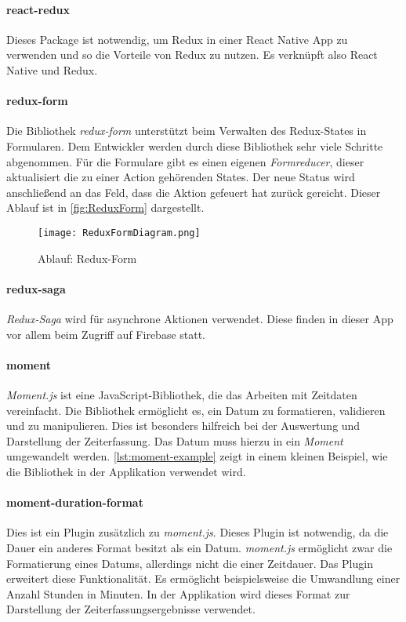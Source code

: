 \paragraph{react-redux}
Dieses Package ist notwendig, um Redux in einer React Native App zu verwenden und so die Vorteile von
Redux zu nutzen. Es verknüpft also React Native und Redux.
\cite{ReactRedux:online}

\paragraph{redux-form}
Die Bibliothek \textit{redux-form} unterstützt beim Verwalten des Redux-States in Formularen.
Dem Entwickler werden durch diese Bibliothek sehr viele Schritte abgenommen. Für die Formulare
gibt es einen eigenen \textit{Formreducer}, dieser aktualisiert die zu einer Action gehörenden States.
Der neue Status wird anschließend an das Feld, dass die Aktion gefeuert hat zurück gereicht. Dieser
Ablauf ist in \autoref{fig:ReduxForm} dargestellt. \cite{ReduxForm:online}

\begin{figure}[h]
    \centering
    \texttt{[image: ReduxFormDiagram.png]}
    \caption{Ablauf: Redux-Form}
    \label{fig:ReduxForm}
\end{figure}

\paragraph{redux-saga}
\textit{Redux-Saga} wird für asynchrone Aktionen verwendet. Diese finden in dieser
App vor allem beim Zugriff auf Firebase statt. \cite{ReduxSaga:online,}

\paragraph{moment}
\textit{Moment.js} ist eine JavaScript-Bibliothek, die das Arbeiten mit Zeitdaten vereinfacht. Die Bibliothek ermöglicht es,
ein Datum zu formatieren, validieren und zu manipulieren. Dies ist besonders hilfreich bei der Auswertung und Darstellung der
Zeiterfassung. Das Datum muss hierzu in ein \textit{Moment} umgewandelt werden. \autoref{lst:moment-example} zeigt in einem kleinen Beispiel,
wie die Bibliothek in der Applikation verwendet wird. \cite{MomentJS:online}


\paragraph{moment-duration-format}
Dies ist ein Plugin zusätzlich zu \textit{moment.js}. Dieses Plugin ist notwendig, da die Dauer ein anderes Format besitzt als ein Datum.
\textit{moment.js} ermöglicht zwar die Formatierung eines Datums,
allerdings nicht die einer Zeitdauer.
Das Plugin erweitert diese Funktionalität.
Es ermöglicht beispielsweise die Umwandlung einer Anzahl Stunden in Minuten.
In der Applikation wird dieses Format zur Darstellung der Zeiterfassungsergebnisse verwendet. \cite{MomentDuration:online}